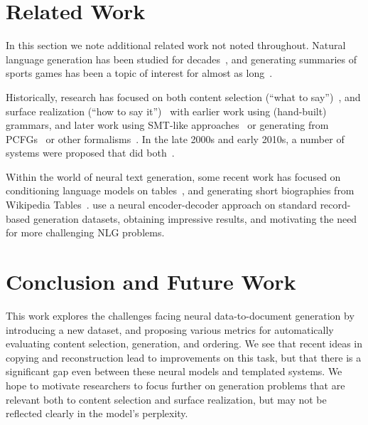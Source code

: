 \documentclass[11pt,letterpaper]{article}
\begin{document}
\section{Related Work}
In this section we note additional related work not noted throughout. Natural language generation has been studied for decades~\citep{kukich1983design,mckeown1992text,reiter1997building}, and generating summaries of sports games has been a topic of interest for almost as long~\citep{robin1994revision,tanaka1998reactive,barzilay2005collective}.

Historically, research has focused on both content selection (``what to say'')~\citep{kukich1983design,mckeown1992text,
reiter1997building,duboue2003statistical,barzilay2005collective}, and surface realization (``how to say it'')~\citep{goldberg1994using,reiter2005choosing} with earlier work using (hand-built) grammars, and later work using SMT-like approaches~\citep{wong2007generation} or generating from PCFGs~\citep{belz2008automatic} or other formalisms~\citep{soricut2006stochastic,white2007towards}. In the late 2000s and early 2010s, a number of systems were proposed that did both~\citep{liang2009learning,angeli2010simple,
kim2010generative,lu2011probabilistic,konstas2013global}.

Within the world of neural text generation, some recent work has focused on conditioning language models on tables~\citep{yang2016reference}, and generating short biographies from Wikipedia Tables~\citep{lebret2016neural, chisholm2017learning}. \citet{mei2016what} use a neural encoder-decoder approach on standard record-based generation datasets, obtaining impressive results, and motivating the need for more challenging NLG problems. 

\section{Conclusion and Future Work}
This work explores the challenges facing neural data-to-document
generation by introducing a new dataset, and proposing
various metrics for automatically evaluating content selection,
generation, and ordering. We see that recent ideas in copying and
reconstruction lead to improvements on this task, but that there is 
a significant gap even between these neural models and templated systems. We hope to 
motivate researchers to focus further on generation
problems that are relevant both to content selection and surface realization, but may not be reflected clearly in the model's perplexity. 
\end{document}
